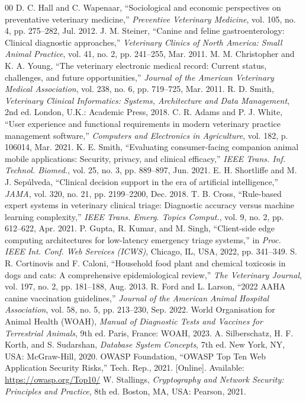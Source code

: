 \documentclass[conference]{IEEEtran}
\begin{document}
\begin{thebibliography}{00}
 D. C. Hall and C. Wapenaar, ``Sociological and economic perspectives on preventative veterinary medicine,'' \textit{Preventive Veterinary Medicine}, vol. 105, no. 4, pp. 275--282, Jul. 2012.
 J. M. Steiner, ``Canine and feline gastroenterology: Clinical diagnostic approaches,'' \textit{Veterinary Clinics of North America: Small Animal Practice}, vol. 41, no. 2, pp. 241--255, Mar. 2011.
 M. M. Christopher and K. A. Young, ``The veterinary electronic medical record: Current status, challenges, and future opportunities,'' \textit{Journal of the American Veterinary Medical Association}, vol. 238, no. 6, pp. 719--725, Mar. 2011.
 R. D. Smith, \textit{Veterinary Clinical Informatics: Systems, Architecture and Data Management}, 2nd ed. London, U.K.: Academic Press, 2018.
 C. R. Adams and P. J. White, ``User experience and functional requirements in modern veterinary practice management software,'' \textit{Computers and Electronics in Agriculture}, vol. 182, p. 106014, Mar. 2021.
 K. E. Smith, ``Evaluating consumer-facing companion animal mobile applications: Security, privacy, and clinical efficacy,'' \textit{IEEE Trans. Inf. Technol. Biomed.}, vol. 25, no. 3, pp. 889--897, Jun. 2021.
 E. H. Shortliffe and M. J. Sep\'{u}lveda, ``Clinical decision support in the era of artificial intelligence,'' \textit{JAMA}, vol. 320, no. 21, pp. 2199--2200, Dec. 2018.
 T. B. Cross, ``Rule-based expert systems in veterinary clinical triage: Diagnostic accuracy versus machine learning complexity,'' \textit{IEEE Trans. Emerg. Topics Comput.}, vol. 9, no. 2, pp. 612--622, Apr. 2021.
 P. Gupta, R. Kumar, and M. Singh, ``Client-side edge computing architectures for low-latency emergency triage systems,'' in \textit{Proc. IEEE Int. Conf. Web Services (ICWS)}, Chicago, IL, USA, 2022, pp. 341--349.
 S. R. Cortinovis and F. Caloni, ``Household food plant and chemical toxicosis in dogs and cats: A comprehensive epidemiological review,'' \textit{The Veterinary Journal}, vol. 197, no. 2, pp. 181--188, Aug. 2013.
 R. Ford and L. Larson, ``2022 AAHA canine vaccination guidelines,'' \textit{Journal of the American Animal Hospital Association}, vol. 58, no. 5, pp. 213--230, Sep. 2022.
 World Organisation for Animal Health (WOAH), \textit{Manual of Diagnostic Tests and Vaccines for Terrestrial Animals}, 9th ed. Paris, France: WOAH, 2023.
 A. Silberschatz, H. F. Korth, and S. Sudarshan, \textit{Database System Concepts}, 7th ed. New York, NY, USA: McGraw-Hill, 2020.
 OWASP Foundation, ``OWASP Top Ten Web Application Security Risks,'' Tech. Rep., 2021. [Online]. Available: \url{https://owasp.org/Top10/}
 W. Stallings, \textit{Cryptography and Network Security: Principles and Practice}, 8th ed. Boston, MA, USA: Pearson, 2021.
\end{thebibliography}
\end{document}
